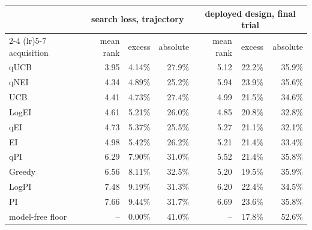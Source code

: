 \begin{tabular}{lrrrrrr}
\toprule
 & \multicolumn{3}{c}{search loss, trajectory} & \multicolumn{3}{c}{deployed design, final trial} \\
\cmidrule(lr){2-4} \cmidrule(lr){5-7}
acquisition & mean rank & excess & absolute & mean rank & excess & absolute \\
\midrule
qUCB & 3.95 & 4.14\% & 27.9\% & 5.12 & 22.2\% & 35.9\% \\
qNEI & 4.34 & 4.89\% & 25.2\% & 5.94 & 23.9\% & 35.6\% \\
UCB & 4.41 & 4.73\% & 27.4\% & 4.99 & 21.5\% & 34.6\% \\
LogEI & 4.61 & 5.21\% & 26.0\% & 4.85 & 20.8\% & 32.8\% \\
qEI & 4.73 & 5.37\% & 25.5\% & 5.27 & 21.1\% & 32.1\% \\
EI & 4.98 & 5.42\% & 26.2\% & 5.21 & 21.4\% & 33.4\% \\
qPI & 6.29 & 7.90\% & 31.0\% & 5.52 & 21.4\% & 35.8\% \\
Greedy & 6.56 & 8.11\% & 32.5\% & 5.20 & 19.5\% & 35.9\% \\
LogPI & 7.48 & 9.19\% & 31.3\% & 6.20 & 22.4\% & 34.5\% \\
PI & 7.66 & 9.44\% & 31.7\% & 6.69 & 23.6\% & 35.8\% \\
\midrule
model-free floor & -- & 0.00\% & 41.0\% & -- & 17.8\% & 52.6\% \\
\bottomrule
\end{tabular}
